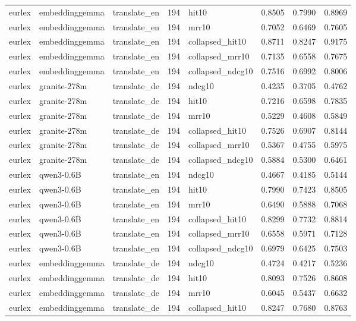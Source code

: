 \begin{tabular}{lllrlrrr}
eurlex & embeddinggemma & translate\_en & 194 & hit10 & 0.8505 & 0.7990 & 0.8969 \\
eurlex & embeddinggemma & translate\_en & 194 & mrr10 & 0.7052 & 0.6469 & 0.7605 \\
eurlex & embeddinggemma & translate\_en & 194 & collapsed\_hit10 & 0.8711 & 0.8247 & 0.9175 \\
eurlex & embeddinggemma & translate\_en & 194 & collapsed\_mrr10 & 0.7135 & 0.6558 & 0.7675 \\
eurlex & embeddinggemma & translate\_en & 194 & collapsed\_ndcg10 & 0.7516 & 0.6992 & 0.8006 \\
eurlex & granite-278m & translate\_de & 194 & ndcg10 & 0.4235 & 0.3705 & 0.4762 \\
eurlex & granite-278m & translate\_de & 194 & hit10 & 0.7216 & 0.6598 & 0.7835 \\
eurlex & granite-278m & translate\_de & 194 & mrr10 & 0.5229 & 0.4608 & 0.5849 \\
eurlex & granite-278m & translate\_de & 194 & collapsed\_hit10 & 0.7526 & 0.6907 & 0.8144 \\
eurlex & granite-278m & translate\_de & 194 & collapsed\_mrr10 & 0.5367 & 0.4755 & 0.5975 \\
eurlex & granite-278m & translate\_de & 194 & collapsed\_ndcg10 & 0.5884 & 0.5300 & 0.6461 \\
eurlex & qwen3-0.6B & translate\_en & 194 & ndcg10 & 0.4667 & 0.4185 & 0.5144 \\
eurlex & qwen3-0.6B & translate\_en & 194 & hit10 & 0.7990 & 0.7423 & 0.8505 \\
eurlex & qwen3-0.6B & translate\_en & 194 & mrr10 & 0.6490 & 0.5888 & 0.7068 \\
eurlex & qwen3-0.6B & translate\_en & 194 & collapsed\_hit10 & 0.8299 & 0.7732 & 0.8814 \\
eurlex & qwen3-0.6B & translate\_en & 194 & collapsed\_mrr10 & 0.6558 & 0.5971 & 0.7128 \\
eurlex & qwen3-0.6B & translate\_en & 194 & collapsed\_ndcg10 & 0.6979 & 0.6425 & 0.7503 \\
eurlex & embeddinggemma & translate\_de & 194 & ndcg10 & 0.4724 & 0.4217 & 0.5236 \\
eurlex & embeddinggemma & translate\_de & 194 & hit10 & 0.8093 & 0.7526 & 0.8608 \\
eurlex & embeddinggemma & translate\_de & 194 & mrr10 & 0.6045 & 0.5437 & 0.6632 \\
eurlex & embeddinggemma & translate\_de & 194 & collapsed\_hit10 & 0.8247 & 0.7680 & 0.8763 \\

\end{tabular}
